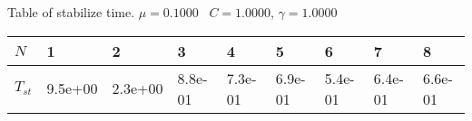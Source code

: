 \begin{center}
Table of stabilize time. $\mu = 0.1000$ \, $C = 1.0000$, $\gamma = 1.0000$
  
\begin{tabular}{|p{0.6in}|p{0.6in}|p{0.6in}|p{0.6in}|p{0.6in}|p{0.6in}|p{0.6in}|p{0.6in}|p{0.6in}|} \hline
$N$ &1 &2 &3 &4 &5 &6 &7 &8 \\ \hline 
$T_{st}$ &9.5e+00 &2.3e+00 &8.8e-01 &7.3e-01 &6.9e-01 &5.4e-01 &6.4e-01 &6.6e-01 \\ \hline 

\end{tabular}\\[20pt]
\end{center}
